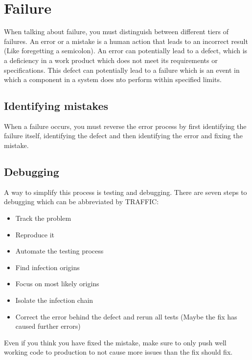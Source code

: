\documentclass{article}
\begin{document}
 	\section{Failure}
 	When talking about failure, you must distinguish between different tiers of failures. An error or a mistake is a human action that leads to an incorrect result (Like foregetting a semicolon). An error can potentially lead to a defect, which is a deficiency in a work product which does not meet its requirements or specifications. This defect can potentially lead to a failure which is an event in which a component in a system does nto perform within specified limits.
 	\subsection{Identifying mistakes}
 	When a failure occurs, you must reverse the error process by first identifying the failure itself, identifying the defect and then identifying the error and fixing the mistake.
 	\subsection{Debugging}
 	A way to simplify this process is testing and debugging. There are seven steps to debugging which can be abbreviated by TRAFFIC:
 	\begin{itemize}
 		\item{Track the problem}
 		\item{Reproduce it}
 		\item{Automate the testing process}
 		\item{Find infection origins}
 		\item{Focus on most likely origins}
 		\item{Isolate the infection chain}
 		\item{Correct the error behind the defect and rerun all tests (Maybe the fix has caused further errors)}
 	\end{itemize}
 	Even if you think you have fixed the mistake, make sure to only push well working code to production to not cause more issues than the fix should fix.
\end{document}
